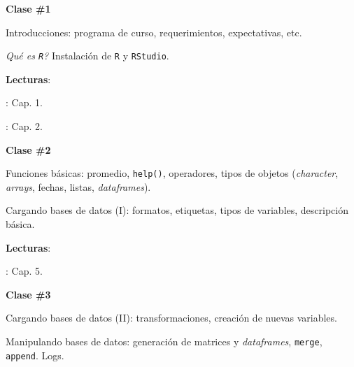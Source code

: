 \documentclass[letterpaper]{article}
\renewenvironment{itemize}{
  \begin{list}{}{
    \setlength{\leftmargin}{1.5em}
  }
}{
  \end{list}
}
\begin{document}
\begin{enumerate}
	\item {}

			\begin{itemize} 
				\item[$\bullet$] {\bf Clase \#1}
				\begin{itemize} 
					\item[$\circ$] Introducciones: programa de curso, requerimientos, expectativas, etc.
					\item[$\circ$] \emph{Qu\'e es \texttt{R}?} Instalaci\'on de \texttt{R} y \texttt{RStudio}.
					\item[$\circ$] {\bf Lecturas}: 
						\begin{itemize} 
							\item[$\diamond$] \textcite{Wooldridge2010}: Cap. 1.
							\item[$\diamond$] \textcite{Urdinez:2019aa}: Cap. 2.
						\end{itemize}
				\end{itemize}
			\end{itemize}






			\begin{itemize} 
				\item[$\bullet$] {\bf Clase \#2}
				\begin{itemize} 
					\item[$\circ$] Funciones b\'asicas: promedio, \texttt{help()}, operadores, tipos de objetos (\emph{character}, \emph{arrays}, fechas, listas, \emph{dataframes}).
					\item[$\circ$] Cargando bases de datos (I): formatos, etiquetas, tipos de variables, descripci\'on b\'asica. %
					\item[$\circ$] {\bf Lecturas}: 
					\begin{itemize}
						\item[$\diamond$] \textcite{Urdinez:2019aa}: Cap. 5.
					\end{itemize}
				\end{itemize}
			\end{itemize}




			\begin{itemize} 
				\item[$\bullet$] {\bf Clase \#3}
					\begin{itemize} 
				\item[$\circ$] Cargando bases de datos (II): transformaciones, creaci\'on de nuevas variables.
				\item[$\circ$] Manipulando bases de datos: generaci\'on de matrices y \emph{dataframes}, \texttt{merge}, \texttt{append}. Logs.  %
					\end{itemize}
			\end{itemize}





\end{enumerate}
\end{document}
